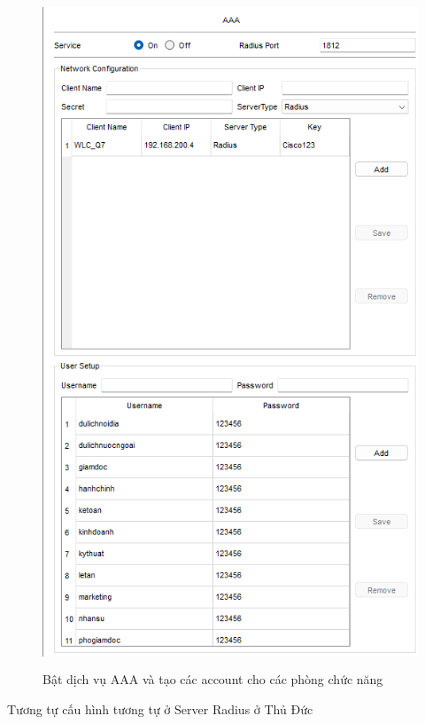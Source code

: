 \documentclass[a4paper, 12pt]{article}
\begin{document}
\begin{figure}[H]
    \centering
    \includegraphics[width=16cm, height=20cm]{img/4.2.5b.png}
    \caption{Bật dịch vụ AAA và tạo các account cho các phòng chức năng}
    \label{hinh425b}
\end{figure}
\hspace*{0.25cm}Tương tự cấu hình tương tự ở Server Radius ở Thủ Đức\\
\end{document}
